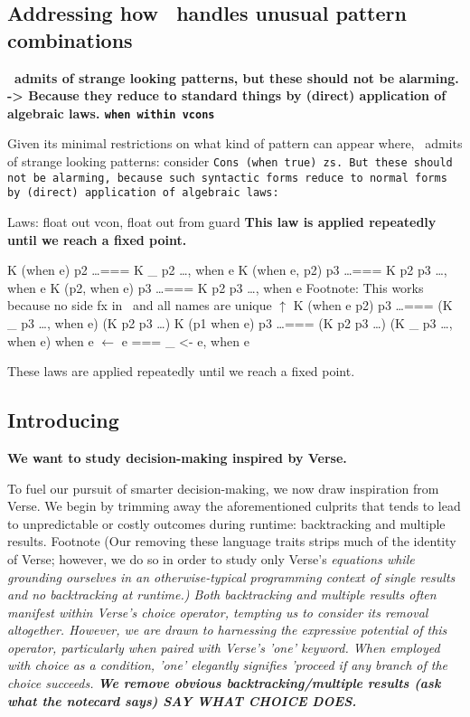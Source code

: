 \documentclass[manuscript,screen,review, 12pt]{acmart}
\begin{document}
\begin{outline}[enumerate]
    
\subsection{Addressing how \PPlus\ handles unusual pattern combinations}
\2 \bf{\PPlus\ admits of strange looking patterns, but these should not be alarming. }
\2 \bf{-> Because they reduce to standard things by (direct) application of algebraic laws. }
\3 \bf{\tt{when} within vcons }

    Given its minimal restrictions on what kind of pattern can appear where,
    \PPlus\ admits of strange looking patterns: consider \tt{Cons (when true)
    zs}. But these should not be alarming, because such syntactic forms reduce
    to normal forms by (direct) application of algebraic laws: 

    
        \3 Laws: float out vcon, float out from guard
        \3 \bf{This law is applied repeatedly until we reach a fixed point.}

        \3 K (when e) p2 \dots === K \_ p2 \dots, when e
        \3 K (when e, p2) p3 \dots  === K p2 p3 \dots, when e
        \3 K (p2, when e) p3 \dots  === K p2 p3 \dots, when e
        \3 Footnote: This works because no side fx in \PPlus\ and all names are unique $\uparrow$ 
        \3 K (when e \pbar p2) p3 \dots === (K \_ p3 \dots, when e) \pbar (K p2 p3 \dots)
        \3 K (p1 \pbar when e) p3 \dots === (K p2 p3 \dots) \pbar (K \_ p3 \dots, when e) 
        \3 when e $\leftarrow$ e === \_ <- e, when e

        
        These laws are applied repeatedly until we reach a fixed point. 
        
\subsection{Introducing \VMinus\ }
\1 \bf{We want to study decision-making inspired by Verse. }
        
        To fuel our pursuit of smarter decision-making, we now draw inspiration
        from Verse. We begin by trimming away the aforementioned culprits that
        tends to lead to unpredictable or costly outcomes during runtime:
        backtracking and multiple results. Footnote (Our removing these language
        traits strips much of the identity of Verse; however, we do so in order
        to study only Verse's \it{equations} while grounding ourselves in an
        otherwise-typical programming context of single results and no
        backtracking at runtime.) Both backtracking and multiple results often
        manifest within Verse's choice operator, tempting us to consider its
        removal altogether. However, we are drawn to harnessing the expressive
        potential of this operator, particularly when paired with Verse's 'one'
        keyword. When employed with choice as a condition, 'one' elegantly
        signifies 'proceed if any branch of the choice succeeds.
        \2 \bf{We remove obvious backtracking/multiple results (ask what the notecard says)}
        SAY WHAT CHOICE DOES. 


\end{outline}
\end{document}
